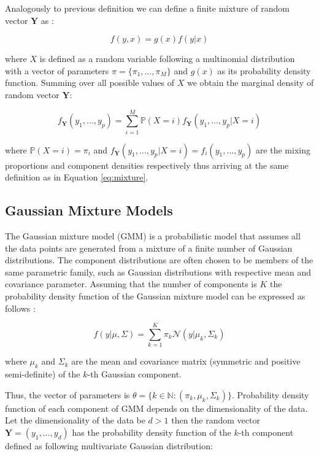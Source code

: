 Analogously to previous definition we can define a finite mixture of random vector $\textbf{Y}$ as \citep{Bishop2006}:

\begin{equation}
    f(y,x) = g(x) f(y|x)
\end{equation}

where $X$ is defined as a random variable following a multinomial distribution with a vector of parameters $\pi = \{\pi_1,\ldots,\pi_M\}$ and $g(x)$ as its 
probability density function. Summing over all possible values of $X$ we obtain the marginal density of random vector $\textbf{Y}$:

\begin{equation}
    f_{\textbf{Y}}(y_1,\ldots,y_p)= \sum_{i=1}^{M} \mathbb{P}(X=i) f_{\textbf{Y}}(y_1,\ldots,y_p|X=i)
\end{equation}
    
where $\mathbb{P}(X=i) = \pi_i$ and $f_{\textbf{Y}}(y_1,\ldots,y_p|X=i) = f_i(y_1,\ldots,y_p)$ are the mixing proportions and component densities respectively thus arriving at the same definition 
as in Equation \ref{eq:mixture}.

\subsection{Gaussian Mixture Models}

The Gaussian mixture model (GMM) is a probabilistic model that assumes all the data points are generated 
from a mixture of a finite number of Gaussian distributions. The component distributions are often chosen to be members of the same parametric family,
such as Gaussian distributions with respective mean and covariance parameter. Assuming that the number of components is $K$
the probability density function of the Gaussian mixture model can be expressed as follows \citep{Bishop2006}:

\begin{equation}
    f(y|\mu,\Sigma) = \sum_{k=1}^{K} \pi_k \mathcal{N}(y|\mu_k, \Sigma_k)
\end{equation}

where $\mu_k$ and $\Sigma_k$ are the mean and covariance matrix (symmetric and positive semi-definite) of the $k$-th Gaussian component. 

Thus, the vector of parameters is $\theta = \{k \in \mathbb{N}: (\pi_k,\mu_k,\Sigma_k)\}$. Probability density function of each component of GMM depends on the dimensionality of the data.
Let the dimensionality of the data be $d>1$ then the random vector $\textbf{Y}=(y_1,\ldots,y_d)$ has the probability density function of the $k$-th component 
defined as following multivariate Gaussian distribution:

